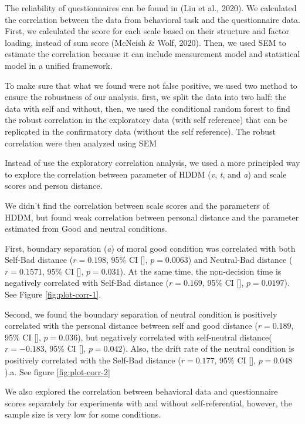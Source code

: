 \documentclass[
  english,
  man]{apa6}
\begin{document}
The reliability of questionnaires can be found in (Liu et al., 2020). We calculated the correlation between the data from behavioral task and the questionnaire data. First, we calculated the score for each scale based on their structure and factor loading, instead of sum score (McNeish \& Wolf, 2020). Then, we used SEM to estimate the correlation because it can include measurement model and statistical model in a unified framework.

To make sure that what we found were not false positive, we used two method to ensure the robustness of our analysis. first, we split the data into two half: the data with self and without, then, we used the conditional random forest to find the robust correlation in the exploratory data (with self reference) that can be replicated in the confirmatory data (without the self reference). The robust correlation were then analyzed using SEM

Instead of use the exploratory correlation analysis, we used a more principled way to explore the correlation between parameter of HDDM (\emph{v}, \emph{t}, and \emph{a}) and scale scores and person distance.

We didn't find the correlation between scale scores and the parameters of HDDM, but found weak correlation between personal distance and the parameter estimated from Good and neutral conditions.

First, boundary separation (\emph{a}) of moral good condition was correlated with both Self-Bad distance (\(r = 0.198\), 95\% CI {[}{]}, \(p = 0.0063\)) and Neutral-Bad distance (\(r = 0.1571\), 95\% CI {[}{]}, \(p = 0.031\)). At the same time, the non-decision time is negatively correlated with Self-Bad distance (\(r = 0.169\), 95\% CI {[}{]}, \(p = 0.0197\)). See Figure \ref{fig:plot-corr-1}.

Second, we found the boundary separation of neutral condition is positively correlated with the personal distance between self and good distance (\(r = 0.189\), 95\% CI {[}{]}, \(p = 0.036\)), but negatively correlated with self-neutral distance(\(r = -0.183\), 95\% CI {[}{]}, \(p = 0.042\)). Also, the drift rate of the neutral condition is positively correlated with the Self-Bad distance (\(r = 0.177\), 95\% CI {[}{]}, \(p = 0.048\)).a. See figure \ref{fig:plot-corr-2}

We also explored the correlation between behavioral data and questionnaire scores separately for experiments with and without self-referential, however, the sample size is very low for some conditions.
\end{document}
